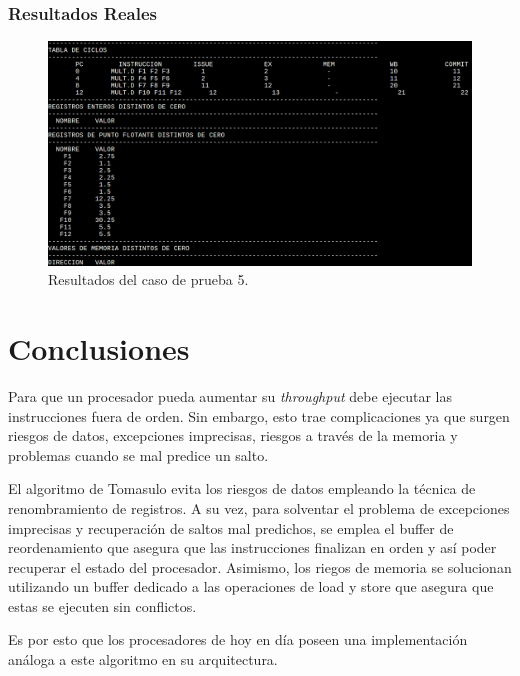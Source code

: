 \documentclass[a4paper]{article}
\begin{document}
	\subsubsection*{Resultados Reales}

\begin{figure}[H]
	\centering
	\includegraphics[width=1\textwidth]{figures/test5.png}
	\caption{\label{fig:bloques}Resultados del caso de prueba 5.}
	\end{figure}


	\section{Conclusiones}
	
	Para que un procesador pueda aumentar su \textit{throughput} debe ejecutar las instrucciones fuera de orden. Sin embargo, esto trae complicaciones ya que surgen riesgos de datos, excepciones imprecisas, riesgos a través de la memoria y problemas cuando se mal predice un salto.
	
	El algoritmo de Tomasulo evita los riesgos de datos empleando la técnica de renombramiento de registros. A su vez, para solventar el problema de excepciones imprecisas y recuperación de saltos mal predichos, se emplea el buffer de reordenamiento que asegura que las instrucciones finalizan en orden y así poder recuperar el estado del procesador.	Asimismo, los riegos de memoria se solucionan utilizando un buffer dedicado a las operaciones de load y store que asegura que estas se ejecuten sin conflictos. 

	Es por esto que los procesadores de hoy en día poseen una implementación análoga a este algoritmo en su arquitectura. 

	
\end{document}
